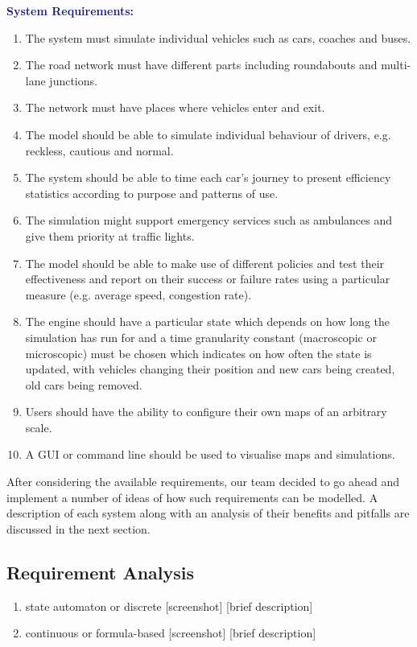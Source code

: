 \documentclass{article}
\begin{document}
{\bf\textcolor{MidnightBlue}{System Requirements:}}
\begin{enumerate}
	
	\item The system must simulate individual vehicles such as cars, coaches and buses.
	\item The road network must have different parts including roundabouts and multi-lane junctions. 
	\item The network must have places where vehicles enter and exit.
	\item The model should be able to simulate individual behaviour of drivers, e.g. reckless, cautious and normal. 
	\item The system should be able to time each car's journey to present efficiency statistics according to purpose and patterns of use. 
	\item The simulation might support emergency services such as ambulances and give them priority at traffic lights.
	\item The model should be able to make use of different policies and test their effectiveness and report on their success or failure rates using a particular measure (e.g. average speed, congestion rate).
	\item The engine should have a particular state which depends on how long the simulation has run for and a time granularity constant (macroscopic or microscopic) must be chosen which indicates on how often the state is updated, with vehicles changing their position and new cars being created, old cars being removed.  
	\item Users should have the ability to configure their own maps of an arbitrary scale. 
	\item A GUI or command line should be used to visualise maps and simulations.
\end{enumerate}

\noindent
After considering the available requirements, our team decided to go ahead and implement a number of ideas of how such requirements can be modelled. A description of each system along with an analysis of their benefits and pitfalls are discussed in the next section. 


\subsection{Requirement Analysis}
\noindent
\begin{enumerate}
	
	\item state automaton or discrete
	[screenshot] [brief description]
	\item continuous or formula-based
	[screenshot] [brief description]

\end{enumerate}
\end{document}
